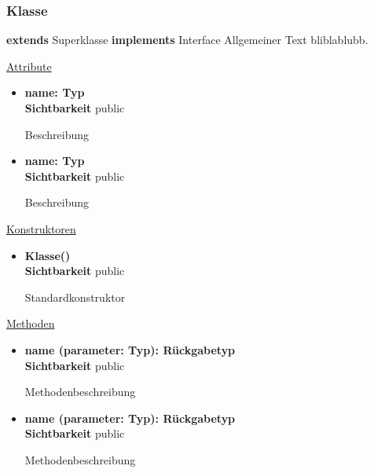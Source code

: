 \subsubsection{Klasse}
\textbf{extends} Superklasse \newline
\textbf{implements} Interface \newline
Allgemeiner Text bliblablubb. \newline

\underline{Attribute}
\begin{itemize}
\itemsep0pt
\item \textbf{name: Typ} \hfill\\ 
\textbf{Sichtbarkeit} public

Beschreibung

\item \textbf{name: Typ} \hfill\\ 
\textbf{Sichtbarkeit} public

Beschreibung
\end{itemize}

\underline{Konstruktoren}
\begin{itemize}
\itemsep0pt
\item \textbf{Klasse()} \hfill\\
\textbf{Sichtbarkeit} public

Standardkonstruktor
\end{itemize}

\underline{Methoden}
\begin{itemize}
\itemsep0pt
\item \textbf{name (parameter: Typ): Rückgabetyp}\hfill\\
\textbf{Sichtbarkeit} public

Methodenbeschreibung

\item \textbf{name (parameter: Typ): Rückgabetyp}\hfill\\
\textbf{Sichtbarkeit} public

Methodenbeschreibung

\end{itemize}